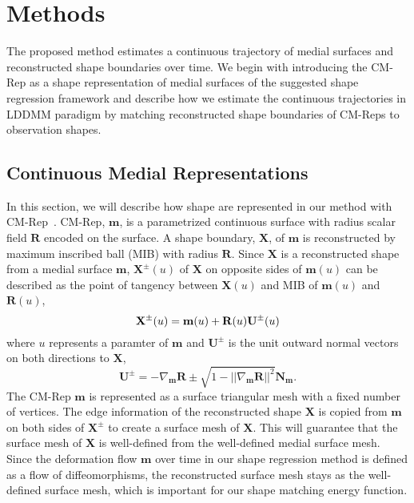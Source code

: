 \documentclass[runningheads,a4paper]{llncs}
\begin{document}
\section{Methods}

The proposed method estimates a continuous trajectory of medial surfaces and reconstructed shape boundaries over time. 
We begin with introducing the CM-Rep as a shape representation of medial surfaces of the suggested shape regression framework and describe how we estimate the continuous trajectories in LDDMM paradigm by matching reconstructed shape boundaries of CM-Reps to observation shapes. 

\subsection{Continuous Medial Representations}
\label{ssec:CMRep}

In this section, we will describe how shape are represented in our method with CM-Rep~\cite{Yushkevich2009}. 
CM-Rep, $\mathbf{m}$, is a parametrized continuous surface with radius scalar field $\mathbf{R}$ encoded on the surface. 
A shape boundary, $\mathbf{X}$, of $\mathbf{m}$ is reconstructed by maximum inscribed ball (MIB) with radius $\mathbf{R}$. 
Since $\mathbf{X}$ is a reconstructed shape from a medial surface $\mathbf{m}$, $\mathbf{X}^{\pm}(u)$ of $\mathbf{X}$ on opposite sides of $\mathbf{m}(u)$ 
can be described as the point of tangency between $\mathbf{X}(u)$ and MIB of $\mathbf{m}(u)$ and $\mathbf{R}(u)$, 
\begin{equation}
 \mathbf{X}^{\pm}(u) = \mathbf{m}(u) + \mathbf{R}(u)\mathbf{U}^{\pm}(u) \\
\end{equation}
where $u$ represents a paramter of $\mathbf{m}$ and $\mathbf{U}^{\pm}$ is the unit outward normal vectors on both directions to $\mathbf{X}$,
\begin{equation}
 \mathbf{U}^{\pm} = -\nabla_\mathbf{m} \mathbf{R} \pm \sqrt{ 1 - || \nabla_\mathbf{m} \mathbf{R} ||^2 }\mathbf{N}_\mathbf{m}.
\end{equation}
The CM-Rep $\mathbf{m}$ is represented as a surface triangular mesh with a fixed number of vertices. 
The edge information of the reconstructed shape $\mathbf{X}$ is copied from $\mathbf{m}$ on both sides of $\mathbf{X}^\pm$ to create a surface mesh of $\mathbf{X}$. 
This will guarantee that the surface mesh of $\mathbf{X}$ is well-defined from the well-defined medial surface mesh. 
Since the deformation flow $\mathbf{m}$ over time in our shape regression method is defined as a flow of diffeomorphisms, the reconstructed surface mesh stays as the well-defined surface mesh, which is important for our shape matching energy function. 
\end{document}
